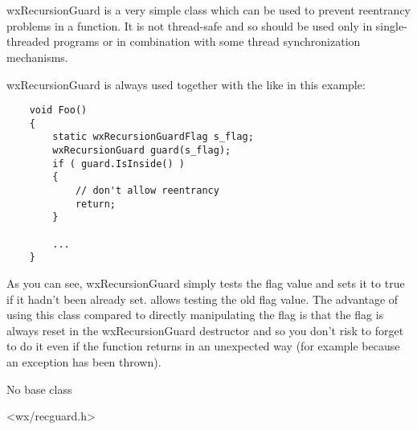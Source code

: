 
\section{}\label{wxrecursionguard}

wxRecursionGuard is a very simple class which can be used to prevent reentrancy
problems in a function. It is not thread-safe and so should be used only in
single-threaded programs or in combination with some thread synchronization
mechanisms.

wxRecursionGuard is always used together with the 
 like in this example:
\begin{verbatim}
    void Foo()
    {
        static wxRecursionGuardFlag s_flag;
        wxRecursionGuard guard(s_flag);
        if ( guard.IsInside() )
        {
            // don't allow reentrancy
            return;
        }

        ...
    }
\end{verbatim}

As you can see, wxRecursionGuard simply tests the flag value and sets it to
true if it hadn't been already set. 
 allows testing the old flag
value. The advantage of using this class compared to directly manipulating the
flag is that the flag is always reset in the wxRecursionGuard destructor and so
you don't risk to forget to do it even if the function returns in an unexpected
way (for example because an exception has been thrown).


No base class


<wx/recguard.h>



\label{wxrecursionguardctor}


